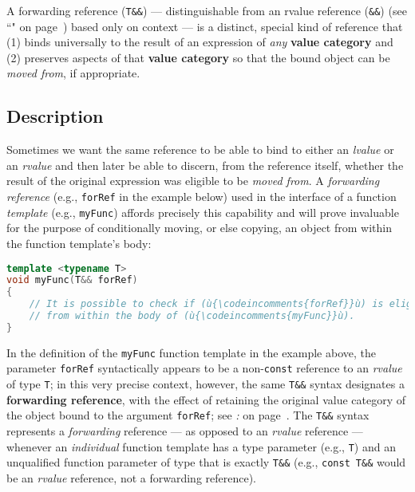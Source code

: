 \label{forwarding-references}

A forwarding reference (\texttt{T\&\&}) --- distinguishable from an
rvalue reference (\texttt{\&\&}) (see ``" on page~\pageref{Rvalue-References}) based only on context
--- is a distinct, special kind of reference that (1) binds
universally to the result of an expression of \emph{any} \textbf{value
category} and (2) preserves aspects of that \textbf{value category} so
that the bound object can be \emph{moved from}, if appropriate.

\subsection[Description]{Description}\label{description-forwardingref}

Sometimes we want the same reference to be able to bind to either an
\emph{lvalue} or an \emph{rvalue} and then later be able to discern,
from the reference itself, whether the result of the original expression
was eligible to be \emph{moved from}. A \emph{forwarding reference}
(e.g., \texttt{forRef} in the example below) used in the interface of a function
\emph{template} (e.g., \texttt{myFunc}) affords precisely this
capability and will prove invaluable for the purpose of conditionally
moving, or else copying, an object from within the function template's
body:

\begin{lstlisting}[language=C++]
template <typename T>
void myFunc(T&& forRef)
{
    // It is possible to check if (ù{\codeincomments{forRef}}ù) is eligible to be moved from or not
    // from within the body of (ù{\codeincomments{myFunc}}ù).
}
\end{lstlisting}

\noindent In the definition of the \texttt{myFunc} function template in the example above, the
parameter \texttt{forRef} syntactically appears to be a
non-\texttt{const} reference to an \emph{rvalue} of type \texttt{T}; in
this very precise context, however, the same \texttt{T\&\&} syntax
designates a \textbf{forwarding reference}, with the effect of retaining
the original value category of the object bound to the argument
\texttt{forRef}; see \textit{: } on page~\pageref{identifying-forwarding-references}. The \texttt{T\&\&} syntax
represents a \emph{forwarding} reference --- as opposed to an
\emph{rvalue} reference --- whenever an \emph{individual} function template has a type parameter (e.g., \texttt{T}) and
an unqualified function parameter of type that is exactly
\texttt{T\&\&} (e.g., \texttt{const}~\texttt{T\&\&} would be an
  \emph{rvalue} reference, not a forwarding reference).

